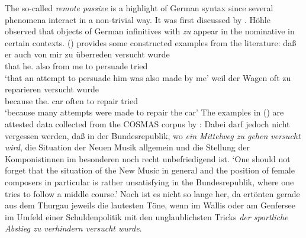 The so-called \emph{remote passive} is a highlight of German syntax since several
phenomena interact in a non-trivial way. It was first discussed by \citet[--176]{Hoehle78a}. Höhle observed that objects of German infinitives with \emph{zu} appear in the
nominative in certain contexts. () provides some constructed examples from the literature:
\eal
\ex{}
\gll daß  er        auch von  mir zu überreden versucht wurde\footnotemark\\
     that he.\NOM{} also from me  to persuade  tried    \AUX\\\german
{}
\glt `that an attempt to persuade him was also made by me'
\ex 
\gll weil    der        Wagen oft   zu reparieren versucht wurde\\
     because the.\NOM{} car   often to repair     tried    \AUX\\
\glt `because many attempts were made to repair the car'\label{bsp-zu-reparieren-versucht-wurde}
\zl
The examples in () are attested data collected from the COSMAS corpus by \citet[--137]{Mueller2002b}:
\eal
\ex Dabei darf jedoch nicht vergessen werden, daß in der Bundesrepublik, wo \emph{ein Mittelweg zu gehen versucht wird}, 
die Situation der Neuen Musik allgemein und die Stellung der Komponistinnen im besonderen noch recht unbefriedigend ist.\footnotemark
%
\glt `One should not forget that the situation of the New Music in general and the position of female composers 
in particular is rather unsatisfying in the Bundesrepublik, where one tries to follow a middle course.'
\ex Noch ist es nicht so lange her, da ertönten gerade aus dem Thurgau jeweils die lautesten Töne, 
    wenn im Wallis oder am Genfersee im Umfeld einer Schuldenpolitik mit den unglaublichsten Tricks 
    \emph{der sportliche Abstieg zu verhindern versucht wurde}.\footnotemark
%
